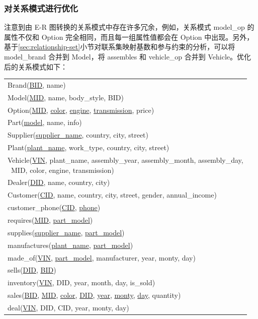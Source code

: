\documentclass[hyperref,a4paper,UTF8]{ctexart}
\begin{document}
\subsubsection{对关系模式进行优化\label{sec:对关系模式进行优化}}

注意到由 E-R 图转换的关系模式中存在许多冗余，例如，关系模式 model\_op 的属性不仅和 Option 完全相同，而且每一组属性值都会在 Option 中出现。另外，基于\ref{sec:relationship-set}小节对联系集映射基数和参与约束的分析，可以将 model\_brand 合并到 Model，将 assembles 和 vehicle\_op 合并到 Vehicle。优化后的关系模式如下：

\begin{center}
    \begin{tabular}{l}
        Brand(\underline{BID}, name)\\
        Model(\underline{MID}, name, body\_style, BID)\\
        Option(\underline{MID}, \underline{color}, \underline{engine}, \underline{transmission}, price)\\
        Part(\underline{model}, name, info)\\
        Supplier(\underline{supplier\_name}, country, city, street)\\
        Plant(\underline{plant\_name}, work\_type, country, city, street)\\
        \makecell[l]{Vehicle(\underline{VIN}, plant\_name, assembly\_year, assembly\_month, assembly\_day, \\ \qquad \quad \  MID, color, engine, transmission)}\\
        Dealer(\underline{DID}, name, country, city)\\
        Customer(\underline{CID}, name, country, city, street, gender, annual\_income)\\
        customer\_phone(\underline{CID}, \underline{phone})\\
        requires(\underline{MID}, \underline{part\_model})\\
        supplies(\underline{supplier\_name}, \underline{part\_model})\\
        manufactures(\underline{plant\_name}, \underline{part\_model})\\
        made\_of(\underline{VIN}, \underline{part\_model}, manufacturer, year, monty, day)\\
        sells(\underline{DID}, \underline{BID})\\
        inventory(\underline{VIN}, DID, year, month, day, is\_sold)\\
        sales(\underline{BID}, \underline{MID}, \underline{color}, \underline{DID}, \underline{year}, \underline{monty}, \underline{day}, quantity)\\
        deal(\underline{VIN}, DID, CID, year, monty, day)
    \end{tabular}
\end{center}
\end{document}

